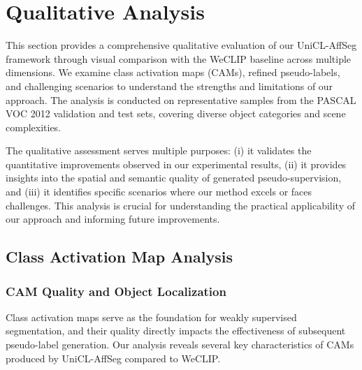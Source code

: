 \section{Qualitative Analysis}
\label{sec:qualitative_analysis}

This section provides a comprehensive qualitative evaluation of our UniCL-AffSeg framework through visual comparison with the WeCLIP baseline across multiple dimensions. We examine class activation maps (CAMs), refined pseudo-labels, and challenging scenarios to understand the strengths and limitations of our approach. The analysis is conducted on representative samples from the PASCAL VOC 2012 validation and test sets, covering diverse object categories and scene complexities.

The qualitative assessment serves multiple purposes: (i) it validates the quantitative improvements observed in our experimental results, (ii) it provides insights into the spatial and semantic quality of generated pseudo-supervision, and (iii) it identifies specific scenarios where our method excels or faces challenges. This analysis is crucial for understanding the practical applicability of our approach and informing future improvements.

\subsection{Class Activation Map Analysis}
\label{subsec:cam_analysis}

\subsubsection{CAM Quality and Object Localization}
\label{subsubsec:cam_quality}

Class activation maps serve as the foundation for weakly supervised segmentation, and their quality directly impacts the effectiveness of subsequent pseudo-label generation. Our analysis reveals several key characteristics of CAMs produced by UniCL-AffSeg compared to WeCLIP.




